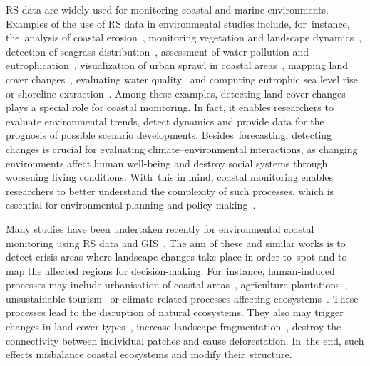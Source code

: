 \documentclass[jmse,article,accept,pdftex,oneauthor]{Definitions/mdpi}
\begin{document}
RS data are widely used for monitoring coastal and marine environments. Examples of the use of RS data in environmental studies include, for~instance, the~analysis of coastal erosion~\cite{MCCARROLL2024107146}, monitoring vegetation and landscape dynamics~\cite{Munroe2022,Morgan}, detection of seagrass distribution~\cite{Traganos}, assessment of water pollution and eutrophication~\cite{ZHU2024262}, visualization of urban sprawl in coastal areas~\cite{su14095700}, mapping land cover changes~\cite{Lemenkova202313}, evaluating water quality~\cite{ZHU2022116187,Lemenkova202322,Kim} and computing eutrophic sea level rise or shoreline extraction~\cite{MCALLISTER2022104102}. Among these examples, detecting land cover changes plays a special role for coastal monitoring. In fact, it enables researchers %
to evaluate environmental trends, detect dynamics and provide data for the prognosis of possible scenario developments. Besides~forecasting, detecting changes is crucial for evaluating climate--environmental interactions, as changing environments affect human well-being and destroy social systems through worsening living conditions. With~this in mind, coastal monitoring enables researchers %
to better understand the complexity of such processes, which is essential for environmental planning and policy making~\cite{MURRAY2000357,COUTTS2016637}.

Many studies have been undertaken recently for environmental coastal monitoring using RS data and GIS~\cite{BISHOPTAYLOR2021112734}. The aim of these and similar works is to detect crisis areas where landscape changes take place in order to~spot and to map the affected regions for decision-making. For~instance, human-induced processes may include urbanisation of coastal areas~\cite{ANTOS2007173}, agriculture plantations~\cite{6723525}, unsustainable tourism~\cite{WESTON200998,Howesetal} or climate-related processes affecting ecosystems~\cite{Glenn,Lemenkova202221}. These processes lead to the {disruption of} natural ecosystems{. They also may trigger changes in} land cover types~\cite{DPCOSTA2024101574}, increase landscape fragmentation~\cite{Lemenkova202406}, destroy the connectivity between individual patches and cause deforestation. In~the end, such effects misbalance coastal ecosystems and modify their~structure.  
\end{document}
